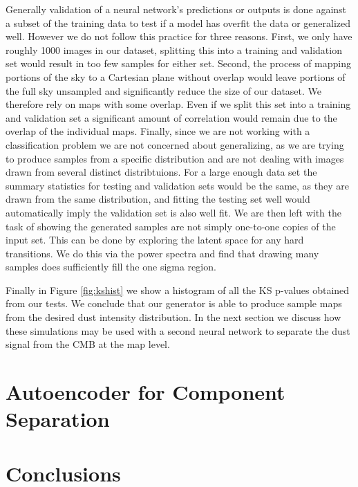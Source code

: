 \documentclass[twocolumn]{aastex62}
\begin{document}
Generally validation of a neural network's predictions or outputs is done against a subset of the training data to test if a model has overfit the data or generalized well. However we do not follow this practice for three reasons. First, we only have roughly 1000 images in our dataset, splitting this into a training and validation set would result in too few samples for either set. Second, the process of mapping portions of the sky to a Cartesian plane without overlap would leave portions of the full sky unsampled and significantly reduce the size of our dataset. We therefore rely on maps with some overlap. Even if we split this set into a training and validation set a significant amount of correlation would remain due to the overlap of the individual maps. Finally, since we are not working with a classification problem we are not concerned about generalizing, as we are trying to produce samples from a specific distribution and are not dealing with images drawn from several distinct distribtuions. For a large enough data set the summary statistics for testing and validation sets would be the same, as they are drawn from the same distribution, and fitting the testing set well would automatically imply the validation set is also well fit. We are then left with the task of showing the generated samples are not simply one-to-one copies of the input set. This can be done by exploring the latent space for any hard transitions. We do this via the power spectra and find that drawing many samples does sufficiently fill the one sigma region.

 Finally in Figure \ref{fig:kshist} we show a histogram of all the KS p-values obtained from our tests. We conclude that our generator is able to produce sample maps from the desired dust intensity distribution. In the next section we discuss how these simulations may be used with a second neural network to separate the dust signal from the CMB at the map level.
 
 



\section{Autoencoder for Component Separation}


\section{Conclusions}


\end{document}
